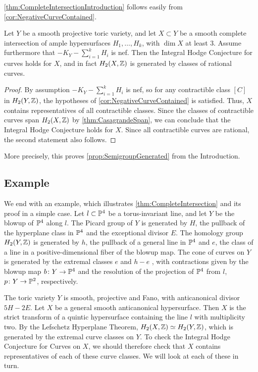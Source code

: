 \cref{thm:CompleteIntersectionIntroduction} follows easily from  \cref{cor:NegativeCurveContained}.
\begin{theorem}[{= \cref{thm:CompleteIntersectionIntroduction}}]
	\label{thm:CompleteIntersection}
	Let $Y$ be a smooth projective toric variety, and let $X \subset Y$ be a smooth complete intersection of ample hypersurfaces $H_1,\dots,H_k$, with $\dim X$ at least 3. Assume furthermore that $-K_Y - \sum_{i=1}^kH_i$ is nef. Then the Integral Hodge Conjecture for curves holds for $X$, and in fact $H_2(X,\Z)$ is generated by classes of rational curves.
\end{theorem}

\begin{proof}
	By assumption $-K_Y - \sum_{i=1}^kH_i$ is nef, so for any contractible class $[C]$ in $H_2(Y,\Z)$, the hypotheses of \cref{cor:NegativeCurveContained} is satisfied. Thus, $X$ contains representatives of all contractible classes. Since the classes of contractible curves span $H_2(X,\Z)$ by \cref{thm:CasagrandeSpan}, we can conclude that the Integral Hodge Conjecture holds for $X$. Since all contractible curves are rational, the second statement also follows.
\end{proof}
More precisely, this proves \cref{prop:SemigroupGenerated} from the Introduction.
\subsection{Example}
\label{sec:ExampleLineBlowup}
 We end with an example, which illustrates \cref{thm:CompleteIntersection} and its proof in a simple case. 
	Let $l \subset \P^4$ be a torus-invariant line, and let $Y$ be the blowup of $\P^4$ along $l$. The Picard group of $Y$ is generated by $H$, the pullback of the hyperplane class in $\P^4$ and the exceptional divisor $E$. The homology group $H_2(Y,\Z)$ is generated by $h$, the pullback of a general line in $\P^4$ and $e$, the class of a line in a positive-dimensional fiber of the blowup map.
	The cone of curves on $Y$ is generated by the extremal classes $e$ and $h-e$ , with contractions given by the blowup map $b \from Y \to \P^4$ and the resolution of the projection of $\P^4$ from $l$, $p \from Y \to \P^2$, respectively.
	
	The toric variety $Y$ is smooth, projective and Fano, with anticanonical divisor $5H - 2E$. Let $X$ be a general smooth anticanonical hypersurface. Then $X$ is the strict transform of a quintic hypersurface containing the line $l$ with multiplicity two. By the Lefschetz Hyperplane Theorem, $H_2(X,\Z) \simeq H_2(Y,\Z)$, which is generated by the extremal curve classes on $Y$. To check the Integral Hodge Conjecture for Curves on $X$, we should therefore check that $X$ contains representatives of each of these curve classes. We will look at each of these in turn.
	
